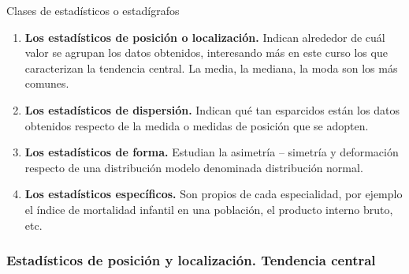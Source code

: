 \documentclass[11pt]{beamer}
\begin{document}
      \begin{frame}{Clases de estadísticos o estadígrafos}
        \begin{enumerate}[<+->]
            \item \textbf{Los estadísticos de posición o localización.} Indican alrededor de cuál valor se agrupan los datos obtenidos, interesando más en este curso los que caracterizan la tendencia central. La media, la mediana, la moda son los más comunes.
            \item \textbf{Los estadísticos de dispersión.} Indican qué tan esparcidos están los datos obtenidos respecto de la medida o medidas de posición que se adopten.
            \item \textbf{Los estadísticos de forma.} Estudian la asimetría – simetría y deformación respecto de una distribución modelo denominada distribución normal.
            \item \textbf{Los estadísticos específicos.} Son propios de cada especialidad, por ejemplo el índice de mortalidad infantil en una población, el producto interno bruto, etc.
        \end{enumerate}

      \end{frame}

      \subsubsection*{Estadísticos de posición y localización. Tendencia central}
\end{document}
